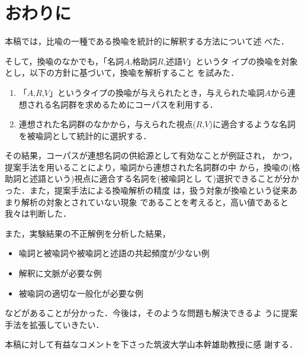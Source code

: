 \section{おわりに} 
\label{sec:conclusion}

本稿では，比喩の一種である換喩を統計的に解釈する方法について述
べた．

そして，換喩のなかでも，「$名詞A$,$格助詞R$,$述語V$」というタ
イプの換喩を対象とし，以下の方針に基づいて，換喩を解析すること
を試みた．

\begin{enumerate}
\item 「$A$,$R$,$V$」というタイプの換喩が与えられたとき，与えられた喩詞$A$から連想される名詞群を求めるためにコーパスを利用する．
\item 連想された名詞群のなかから，与えられた視点($R$,$V$)に適合するような名詞を被喩詞として統計的に選択する．
\end{enumerate}

その結果，コーパスが連想名詞の供給源として有効なことが例証され，
かつ，提案手法を用いることにより，喩詞から連想された名詞群の中
から，換喩の(格助詞と述語という)視点に適合する名詞を(被喩詞とし
て)選択できることが分かった．また，提案手法による換喩解析の精度
は，扱う対象が換喩という従来あまり解析の対象とされていない現象
であることを考えると，高い値であると我々は判断した．

また，実験結果の不正解例を分析した結果，
\begin{itemize}
\item 喩詞と被喩詞や被喩詞と述語の共起頻度が少ない例
\item 解釈に文脈が必要な例
\item 被喩詞の適切な一般化が必要な例
\end{itemize}
などがあることが分かった．今後は，そのような問題も解決できるよ
うに提案手法を拡張していきたい．

\newpage
\acknowledgment

本稿に対して有益なコメントを下さった筑波大学山本幹雄助教授に感
謝する．

\appendix


\clearpage



